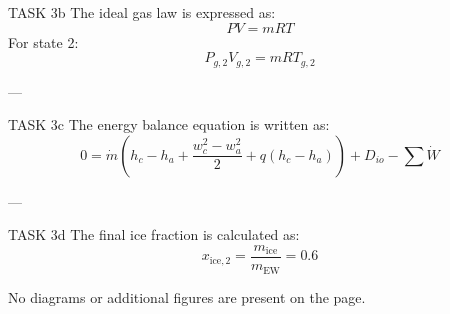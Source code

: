 TASK 3b  
The ideal gas law is expressed as:  
\[
PV = mRT
\]  
For state 2:  
\[
P_{g,2}V_{g,2} = mRT_{g,2}
\]  

---

TASK 3c  
The energy balance equation is written as:  
\[
0 = \dot{m} \left( h_c - h_a + \frac{w_{c}^2 - w_{a}^2}{2} + q(h_c - h_a) \right) + D_{io} - \sum \dot{W}
\]  

---

TASK 3d  
The final ice fraction is calculated as:  
\[
x_{\text{ice},2} = \frac{m_{\text{ice}}}{m_{\text{EW}}} = 0.6
\]  

No diagrams or additional figures are present on the page.
